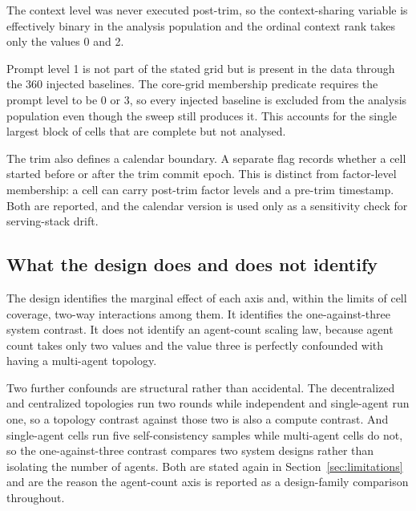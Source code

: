 The  context level was never executed post-trim, so the
context-sharing variable is effectively binary in the analysis population and the ordinal
context rank takes only the values 0 and 2.

Prompt level 1 is not part of the stated grid but is present in the data through the 360
injected baselines. The core-grid membership predicate requires the prompt level to be 0
or 3, so every injected baseline is excluded from the analysis population even though the
sweep still produces it. This accounts for the single largest block of cells that are
complete but not analysed.

The trim also defines a calendar boundary. A separate flag records whether a cell started
before or after the trim commit epoch. This is distinct from factor-level membership: a
cell can carry post-trim factor levels and a pre-trim timestamp. Both are reported, and
the calendar version is used only as a sensitivity check for serving-stack drift.

\subsection{What the design does and does not identify}

The design identifies the marginal effect of each axis and, within the limits of cell
coverage, two-way interactions among them. It identifies the one-against-three system
contrast. It does not identify an agent-count scaling law, because agent count takes only
two values and the value three is perfectly confounded with having a multi-agent
topology.

Two further confounds are structural rather than accidental. The decentralized and
centralized topologies run two rounds while independent and single-agent run one, so a
topology contrast against those two is also a compute contrast. And single-agent cells
run five self-consistency samples while multi-agent cells do not, so the one-against-three
contrast compares two system designs rather than isolating the number of agents. Both are
stated again in Section~\ref{sec:limitations} and are the reason the agent-count axis is
reported as a design-family comparison throughout.
